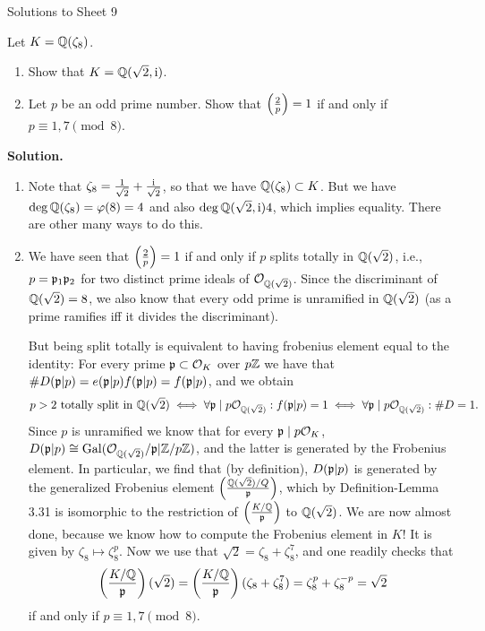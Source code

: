 \documentclass[a4paper,11pt]{article}
\begin{document}
\begin{center}
    \huge{Solutions to Sheet 9}
\end{center}

Let $K = \mathbb{Q}(\zeta_8)$.
\begin{enumerate}
    \item Show that $K = \mathbb{Q}(\sqrt 2, \mathrm i)$. 
    \item Let $p$ be an odd prime number. Show that $\left( \frac{2}{p} \right) = 1$ if and only if
        $p \equiv 1,7 \pmod 8$.
\end{enumerate}
\textbf{Solution.}
\begin{enumerate}[labelindent=0pt, wide] 
    \item Note that $\zeta_8 = \frac 1{\sqrt 2} + \frac {\mathrm i} {\sqrt 2}$, so that we have
        $\mathbb{Q}(\zeta_8) \subset K$. But we have $\deg \mathbb{Q}(\zeta_8) = \varphi(8) = 4$ and 
        also $\deg \mathbb{Q}(\sqrt 2, \mathrm i) 4$, which implies equality. There are other many
        ways to do this.
    \item We have seen that $\left( \frac{2}{p} \right) = 1$ if and only if $p$ splits totally in
        $\mathbb{Q}(\sqrt 2)$, i.e., $p = \mathfrak{p}_1 \mathfrak{p}_2$ for two distinct prime ideals of 
        $\mathcal{O}_{\mathbb{Q}(\sqrt 2)}$. Since the discriminant of $\mathbb{Q}(\sqrt 2) = 8$, we also 
        know that every odd prime is unramified in $\mathbb{Q}(\sqrt 2)$ (as a prime ramifies
        iff it divides the discriminant).

        But being split totally is equivalent to having 
        frobenius element equal to the identity: For every prime 
        $\mathfrak{p} \subset \mathcal{O}_K$ over $p \mathbb{Z}$ we have that $\#D(\mathfrak{p}|p) = e(\mathfrak{p}|p)f(\mathfrak{p}|p) = 
        f(\mathfrak{p}|p)$, and we obtain 
        \begin{equation*}
            \text{$p>2$ totally split in $\mathbb{Q}(\sqrt 2)$} \iff \forall \mathfrak{p} \mid
            p\mathcal{O}_{\mathbb{Q}(\sqrt 2)}: f(\mathfrak{p}|p) = 1 \iff \forall \mathfrak{p} \mid
            p\mathcal{O}_{\mathbb{Q}(\sqrt 2)}:\#D = 1.
        \end{equation*}
        Since $p$ is unramified we know that for every $\mathfrak{p} \mid p\mathcal{O}_K$,
        $D(\mathfrak{p}|p) \cong \operatorname{Gal}(\mathcal{O}_{\mathbb{Q}(\sqrt 2)}/\mathfrak{p} | \mathbb{Z}/p\mathbb{Z})$, and the latter
        is generated by the Frobenius element. In particular, we find that (by
        definition), $D(\mathfrak{p}|p)$ is generated by the generalized Frobenius
        element $\left(\frac{\mathbb{Q}(\sqrt 2)/Q} {\mathfrak{p}} \right)$, which by 
        Definition-Lemma 3.31 is isomorphic to the restriction of
        $\left( \frac{K/\mathbb{Q}}{\mathfrak{p}}\right)$ to $\mathbb{Q}(\sqrt 2)$. 
        We are now almost done, because we know how to compute the Frobenius element 
        in $K$! It is given by $\zeta_8 \mapsto \zeta_8^p$. Now we use that 
        $\sqrt 2 = \zeta_8 + \zeta_8^7$, and one readily checks that 
        \begin{equation*}
            \left( \frac{K/\mathbb{Q}}{\mathfrak{p}}\right)(\sqrt 2) = \left(
            \frac{K/\mathbb{Q}}{\mathfrak{p}}\right)(\zeta_8 + \zeta_8^7) = \zeta_8^p +
            \zeta_8^{-p} = \sqrt 2
        \end{equation*}
        if and only if $p \equiv 1,7 \pmod 8$.
        
\end{enumerate}
\end{document}
